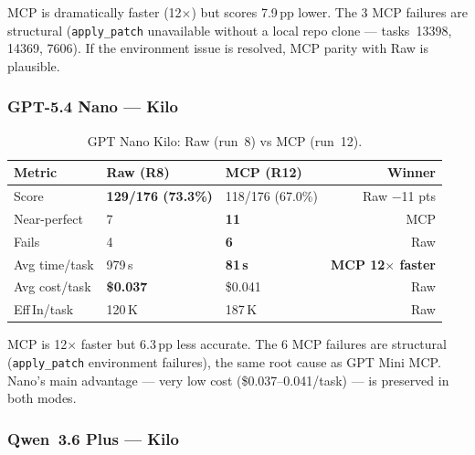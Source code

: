 \noindent
MCP is dramatically faster (12$\times$) but scores 7.9\,pp lower.
The 3 MCP failures are structural (\texttt{apply\_patch} unavailable without
a local repo clone --- tasks~13398, 14369, 7606).
If the environment issue is resolved, MCP parity with Raw is plausible.

\subsubsection{GPT-5.4 Nano --- Kilo}

\begin{table}[h]
\centering
\caption{GPT Nano Kilo: Raw (run~8) vs MCP (run~12).}\label{tab:delta-nano}
\begin{tabular}{lllr}
\toprule
\textbf{Metric} & \textbf{Raw (R8)} & \textbf{MCP (R12)} & \textbf{Winner} \\
\midrule
Score          & \textbf{129/176 (73.3\%)} & 118/176 (67.0\%) & Raw $-$11 pts \\
Near-perfect   & 7                         & \textbf{11}       & MCP \\
Fails          & 4                         & \textbf{6}        & Raw \\
Avg time/task  & 979\,s                    & \textbf{81\,s}    & \textbf{MCP 12$\times$ faster} \\
Avg cost/task  & \textbf{\$0.037}          & \$0.041           & Raw \\
Eff\,In/task   & 120\,K                    & 187\,K            & Raw \\
\bottomrule
\end{tabular}
\end{table}

\noindent
MCP is 12$\times$ faster but 6.3\,pp less accurate.
The 6 MCP failures are structural (\texttt{apply\_patch} environment failures),
the same root cause as GPT Mini MCP.
Nano's main advantage --- very low cost (\$0.037--0.041/task) --- is preserved
in both modes.

\subsubsection{Qwen~3.6 Plus --- Kilo}

